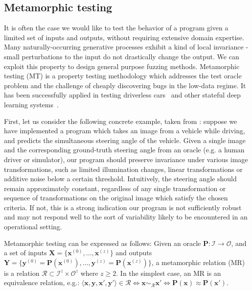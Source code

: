 \documentclass[12pt,initial,twoside,maitrise]{dms}
\numberwithin{equation}{section}
\numberwithin{table}{chapter}
\numberwithin{figure}{chapter}
\begin{document}
\subsection{Metamorphic testing}\label{subsec:metamorphic-testing}

It is often the case we would like to test the behavior of a program given a limited set of inputs and outputs, without requiring extensive domain expertise. Many naturally-occurring generative processes exhibit a kind of local invariance - small perturbations to the input do not drastically change the output. We can exploit this property to design general purpose fuzzing methods. Metamorphic testing (MT) is a property testing methodology which addresses the test oracle problem and the challenge of cheaply discovering bugs in the low-data regime. It has been successfully applied in testing driverless cars~\citep{zhou2019metamorphic, pei2017deepxplore, tian2018deeptest} and other stateful deep learning systems~\citep{du2018deepcruiser}.

First, let us consider the following concrete example, taken from \citet{tian2018deeptest}: suppose we have implemented a program which takes an image from a vehicle while driving, and predicts the simultaneous steering angle of the vehicle. Given a single image and the corresponding ground-truth steering angle from an oracle (e.g. a human driver or simulator), our program should preserve invariance under various image transformations, such as limited illumination changes, linear transformations or additive noise below a certain threshold. Intuitively, the steering angle should remain approximately constant, regardless of any single transformation or sequence of transformations on the original image which satisfy the chosen criteria. If not, this is a strong indication our program is not sufficiently robust and may not respond well to the sort of variability likely to be encountered in an operational setting.

Metamorphic testing can be expressed as follows: Given an oracle $\mathbf P: \mathcal I \rightarrow \mathcal O$, and a set of inputs $\mathbf X = \{\mathbf{x}^{(0)}, \dots, \mathbf{x}^{(z)}\}$ and outputs $\mathbf Y = \{\mathbf{y}^{(0)} = \mathbf{P}(\mathbf{x}^{(0)}), \dots, \mathbf{y}^{(z)} = \mathbf{P}(\mathbf{x}^{(z)})\}$, a metamorphic relation (MR) is a relation $\mathcal R \subset \mathcal I^z \times \mathcal O^z$ where $z \geq 2$. In the simplest case, an MR is an equivalence relation, e.g.: $\langle \mathbf x, \mathbf y, \mathbf x', \mathbf y' \rangle \in \mathcal R \Leftrightarrow \mathbf x \sim_{\mathcal R} \mathbf x' \Leftrightarrow \mathbf P(\mathbf x) \approx \mathbf P(\mathbf x')$.
\end{document}
